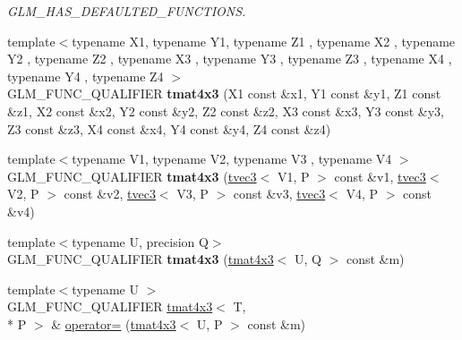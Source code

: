 \begin{DoxyCompactItemize}
\begin{DoxyCompactList}\small\item\em G\-L\-M\-\_\-\-H\-A\-S\-\_\-\-D\-E\-F\-A\-U\-L\-T\-E\-D\-\_\-\-F\-U\-N\-C\-T\-I\-O\-N\-S. \end{DoxyCompactList}\item 
\hypertarget{structglm_1_1tmat4x3_a345c6365fa065203321bbda257bca54a}{{\footnotesize template$<$typename X1, typename Y1, typename Z1 , typename X2 , typename Y2 , typename Z2 , typename X3 , typename Y3 , typename Z3 , typename X4 , typename Y4 , typename Z4 $>$ }\\G\-L\-M\-\_\-\-F\-U\-N\-C\-\_\-\-Q\-U\-A\-L\-I\-F\-I\-E\-R {\bfseries tmat4x3} (X1 const \&x1, Y1 const \&y1, Z1 const \&z1, X2 const \&x2, Y2 const \&y2, Z2 const \&z2, X3 const \&x3, Y3 const \&y3, Z3 const \&z3, X4 const \&x4, Y4 const \&y4, Z4 const \&z4)}\label{structglm_1_1tmat4x3_a345c6365fa065203321bbda257bca54a}

\item 
\hypertarget{structglm_1_1tmat4x3_a39c67aaaba4ee82e36a172a8704a4920}{{\footnotesize template$<$typename V1, typename V2, typename V3 , typename V4 $>$ }\\G\-L\-M\-\_\-\-F\-U\-N\-C\-\_\-\-Q\-U\-A\-L\-I\-F\-I\-E\-R {\bfseries tmat4x3} (\hyperlink{structglm_1_1tvec3}{tvec3}$<$ V1, P $>$ const \&v1, \hyperlink{structglm_1_1tvec3}{tvec3}$<$ V2, P $>$ const \&v2, \hyperlink{structglm_1_1tvec3}{tvec3}$<$ V3, P $>$ const \&v3, \hyperlink{structglm_1_1tvec3}{tvec3}$<$ V4, P $>$ const \&v4)}\label{structglm_1_1tmat4x3_a39c67aaaba4ee82e36a172a8704a4920}

\item 
\hypertarget{structglm_1_1tmat4x3_a977e48f213b5720e0c38342c955cfd3e}{{\footnotesize template$<$typename U, precision Q$>$ }\\G\-L\-M\-\_\-\-F\-U\-N\-C\-\_\-\-Q\-U\-A\-L\-I\-F\-I\-E\-R {\bfseries tmat4x3} (\hyperlink{structglm_1_1tmat4x3}{tmat4x3}$<$ U, Q $>$ const \&m)}\label{structglm_1_1tmat4x3_a977e48f213b5720e0c38342c955cfd3e}

\item 
\hypertarget{structglm_1_1tmat4x3_a45e2023a951f58d15675733993dd3f7a}{{\footnotesize template$<$typename U $>$ }\\G\-L\-M\-\_\-\-F\-U\-N\-C\-\_\-\-Q\-U\-A\-L\-I\-F\-I\-E\-R \hyperlink{structglm_1_1tmat4x3}{tmat4x3}$<$ T, \\*
P $>$ \& \hyperlink{structglm_1_1tmat4x3_a45e2023a951f58d15675733993dd3f7a}{operator=} (\hyperlink{structglm_1_1tmat4x3}{tmat4x3}$<$ U, P $>$ const \&m)}\label{structglm_1_1tmat4x3_a45e2023a951f58d15675733993dd3f7a}


\end{DoxyCompactItemize}
